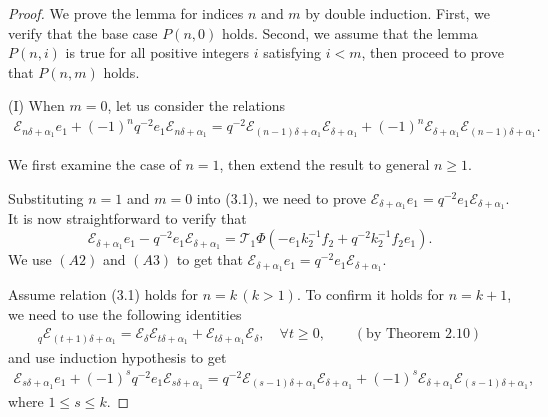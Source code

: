 \documentclass[10pt,a4paper]{amsart}
\begin{document}
\begin{proof}
We prove the lemma for indices \( n \) and \( m \) by double induction. First, we verify that the base case \( P(n,0) \) holds. Second, we assume that the lemma \( P(n,i) \) is true for all positive integers \( i \)  satisfying \( i<m \), then proceed to prove that \( P(n,m) \) holds.

(I) When \(m = 0\), let us consider the relations 
\begin{align}
\mathcal{E}_{n\delta+\alpha_1} e_1 + (-1)^n q^{-2} e_1 \mathcal{E}_{n\delta+\alpha_1} = q^{-2} \mathcal{E}_{(n-1)\delta+\alpha_1} \mathcal{E}_{\delta+\alpha_1} + (-1)^n \mathcal{E}_{\delta+\alpha_1} \mathcal{E}_{(n-1)\delta+\alpha_1}. 
\end{align}

We first examine the case of \(n=1\), then extend the result to general \(n \geq 1\).
 
Substituting \(n = 1\) and \(m = 0\) into (3.1), we need to prove 
\(
\mathcal{E}_{\delta+\alpha_1} e_1 =q^{-2} e_1 \mathcal{E}_{\delta+\alpha_1}.
\) It is now straightforward to verify that 
\[
\mathcal{E}_{\delta+\alpha_1} e_1 - q^{-2} e_1 \mathcal{E}_{\delta+\alpha_1}=\mathcal{T}_1\Phi\left(-e_1k^{-1}_2f_2 + q^{-2}k^{-1}_2f_2e_1\right).
\]    
We use \((A2)\) and \((A3)\) to get that
\(
\mathcal{E}_{\delta+\alpha_1} e_1 =q^{-2} e_1 \mathcal{E}_{\delta+\alpha_1}\).
 
Assume relation (3.1) holds for \(n = k\,(k>1)\). To confirm it holds for \(n = k+1\), we need to use the following identities
\begin{align}
[2]_q\mathcal{E}_{(t+1)\delta+\alpha_{1}} = \mathcal{E}_{\delta}\mathcal{E}_{t\delta+\alpha_{1}} + \mathcal{E}_{t\delta+\alpha_{1}}\mathcal{E}_{\delta},\quad \forall t\ge 0,\qquad (\text{by Theorem 2.10})
\end{align}
and use induction hypothesis to get
\begin{align}
\mathcal{E}_{s\delta+\alpha_1} e_1 + (-1)^s q^{-2} e_1 \mathcal{E}_{s\delta+\alpha_1} = q^{-2} \mathcal{E}_{(s-1)\delta+\alpha_1} \mathcal{E}_{\delta+\alpha_1} + (-1)^s \mathcal{E}_{\delta+\alpha_1} \mathcal{E}_{(s-1)\delta+\alpha_1},
\end{align}
where \(1\le s\le k\).


\end{proof}
\end{document}
